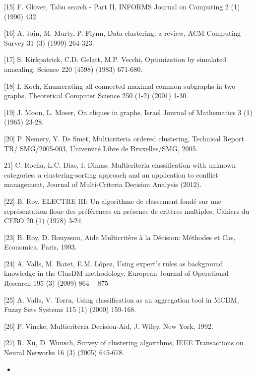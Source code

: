 \documentclass[10pt]{article}
\begin{document}
[15] F. Glover, Tabu search - Part II, INFORMS Journal on Computing 2 (1) (1990) 432.

[16] A. Jain, M. Murty, P. Flynn, Data clustering: a review, ACM Computing Survey 31 (3) (1999) 264-323.

[17] S. Kirkpatrick, C.D. Gelatt, M.P. Vecchi, Optimization by simulated annealing, Science 220 (4598) (1983) 671-680.

[18] I. Koch, Enumerating all connected maximal common subgraphs in two graphs, Theoretical Computer Science 250 (1-2) (2001) 1-30.

[19] J. Moon, L. Moser, On cliques in graphs, Israel Journal of Mathematics 3 (1) (1965) 23-28.

[20] P. Nemery, Y. De Smet, Multicriteria ordered clustering, Technical Report TR/ SMG/2005-003, Université Libre de Bruxelles/SMG, 2005.

21] C. Rocha, L.C. Dias, I. Dimas, Multicriteria classification with unknown categories: a clustering-sorting approach and an application to conflict management, Journal of Multi-Criteria Decision Analysis (2012).

[22] B. Roy, ELECTRE III: Un algorithme de classement fondé sur une représentation floue des préférences en présence de critères multiples, Cahiers du CERO 20 (1) (1978) 3-24.

[23] B. Roy, D. Bouyssou, Aide Multicritère à la Décision: Méthodes et Cas, Economica, Paris, 1993.

[24] A. Valls, M. Batet, E.M. López, Using expert's rules as background knowledge in the ClusDM methodology, European Journal of Operational Research 195 (3) (2009) $864-875$

[25] A. Valls, V. Torra, Using classification as an aggregation tool in MCDM, Fuzzy Sets Systems 115 (1) (2000) 159-168.

[26] P. Vincke, Multicriteria Decision-Aid, J. Wiley, New York, 1992.

[27] R. Xu, D. Wunsch, Survey of clustering algorithms, IEEE Transactions on Neural Networks 16 (3) (2005) 645-678.

\begin{itemize}
  \item 
\end{itemize}
\end{document}
